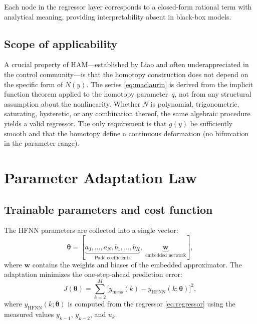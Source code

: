 \documentclass[preprint,12pt]{elsarticle}
\begin{document}
Each node in the regressor layer corresponds to a closed-form rational term with analytical meaning, providing interpretability absent in black-box models.

\subsection{Scope of applicability}
A crucial property of HAM---established by Liao \cite{liao2003, liao2012} and often underappreciated in the control community---is that the homotopy construction does not depend on the specific form of $N(y)$. The series \eqref{eq:maclaurin} is derived from the implicit function theorem applied to the homotopy parameter~$q$, not from any structural assumption about the nonlinearity. Whether $N$ is polynomial, trigonometric, saturating, hysteretic, or any combination thereof, the same algebraic procedure yields a valid regressor. The only requirement is that $g(y)$ be sufficiently smooth and that the homotopy define a continuous deformation (no bifurcation in the parameter range).


\section{Parameter Adaptation Law}
\label{sec:adaptation}

\subsection{Trainable parameters and cost function}
The HFNN parameters are collected into a single vector:
\begin{equation}
\boldsymbol{\theta} = [\underbrace{a_0, \ldots, a_N, b_1, \ldots, b_K}_{\text{Pad\'e coefficients}},\; \underbrace{\mathbf{w}}_{\text{embedded network}}],
\label{eq:theta}
\end{equation}
where $\mathbf{w}$ contains the weights and biases of the embedded approximator. The adaptation minimizes the one-step-ahead prediction error:
\begin{equation}
J(\boldsymbol{\theta}) = \sum_{k=2}^{M} \bigl[y_{\mathrm{meas}}(k) - y_{\mathrm{HFNN}}(k;\boldsymbol{\theta})\bigr]^2,
\label{eq:cost}
\end{equation}
where $y_{\mathrm{HFNN}}(k;\boldsymbol{\theta})$ is computed from the regressor \eqref{eq:regressor} using the measured values $y_{k-1}$, $y_{k-2}$, and $u_k$.
\end{document}

